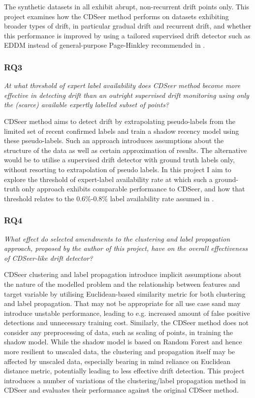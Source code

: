 \documentclass{svproc}
\begin{document}
The synthetic datasets in \cite{pham2025} all exhibit abrupt, non-recurrent drift points only. This project examines how the CDSeer method performs on datasets exhibiting broader types of drift, in particular gradual drift and recurrent drift, and whether this performance is improved by using a tailored supervised drift detector such as EDDM \cite{baena2006} instead of general-purpose Page-Hinkley recommended in \cite{pham2025}.

\subsubsection{RQ3}\textit{At what threshold of expert label availability does CDSeer method become more effective in detecting drift than an outright supervised drift monitoring using only the (scarce) available expertly labelled subset of points? }

CDSeer method aims to detect drift by extrapolating pseudo-labels from the limited set of recent confirmed labels and train a shadow recency model using these pseudo-labels. Such an approach introduces assumptions about the structure of the data as well as certain approximation of results. The alternative would be to utilise a supervised drift detector with ground truth labels only, without resorting to extrapolation of pseudo labels. In this project I aim to explore the threshold of expert-label availability rate at which such a ground-truth only approach exhibits comparable performance to CDSeer, and how that threshold relates to the 0.6\%-0.8\% label availability rate assumed in \cite{pham2025}.

\subsubsection{RQ4}\textit{What effect do selected amendments to the clustering and label propagation approach, proposed by the author of this project, have on the overall effectiveness of CDSeer-like drift detector? }

CDSeer clustering and label propagation introduce implicit assumptions about the nature of the modelled problem and the relationship between features and target variable by utilising Euclidean-based similarity metric for both clustering and label propagation. That may not be appropriate for all use case sand may introduce unstable performance, leading to e.g. increased amount of false positive detections and unnecessary training cost. Similarly, the CDSeer method does not consider any preprocessing of data, such as scaling of points, in training the shadow model. While the shadow model is based on Random Forest and hence more resilient to unscaled data, the clustering and propagation itself may be affected by unscaled data, especially bearing in mind reliance on Euclidean distance metric, potentially leading to less effective drift detection. This project introduces a number of variations of the clustering/label propagation method in CDSeer and evaluates their performance against the original CDSeer method.
\end{document}
